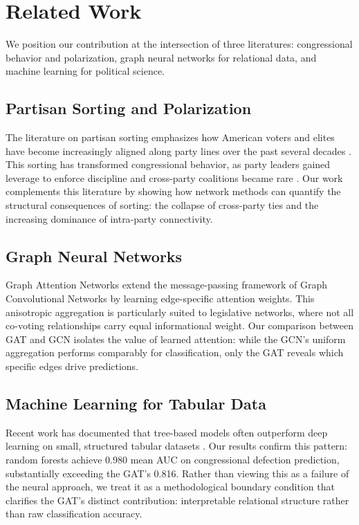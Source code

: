 \documentclass[11pt]{article}
\begin{document}
\section{Related Work}

We position our contribution at the intersection of three literatures: congressional behavior and polarization, graph neural networks for relational data, and machine learning for political science.

\subsection{Partisan Sorting and Polarization}

The literature on partisan sorting emphasizes how American voters and elites have become increasingly aligned along party lines over the past several decades \citep{levendusky2009great, mason2018uncivil}. This sorting has transformed congressional behavior, as party leaders gained leverage to enforce discipline and cross-party coalitions became rare \citep{poole1985spatial}. Our work complements this literature by showing how network methods can quantify the structural consequences of sorting: the collapse of cross-party ties and the increasing dominance of intra-party connectivity.

\subsection{Graph Neural Networks}

Graph Attention Networks \citep{velickovic2018graph} extend the message-passing framework of Graph Convolutional Networks \citep{kipf2017semi} by learning edge-specific attention weights. This anisotropic aggregation is particularly suited to legislative networks, where not all co-voting relationships carry equal informational weight. Our comparison between GAT and GCN isolates the value of learned attention: while the GCN's uniform aggregation performs comparably for classification, only the GAT reveals which specific edges drive predictions.

\subsection{Machine Learning for Tabular Data}

Recent work has documented that tree-based models often outperform deep learning on small, structured tabular datasets \citep{grinsztajn2022tree}. Our results confirm this pattern: random forests achieve 0.980 mean AUC on congressional defection prediction, substantially exceeding the GAT's 0.816. Rather than viewing this as a failure of the neural approach, we treat it as a methodological boundary condition that clarifies the GAT's distinct contribution: interpretable relational structure rather than raw classification accuracy.
\end{document}
